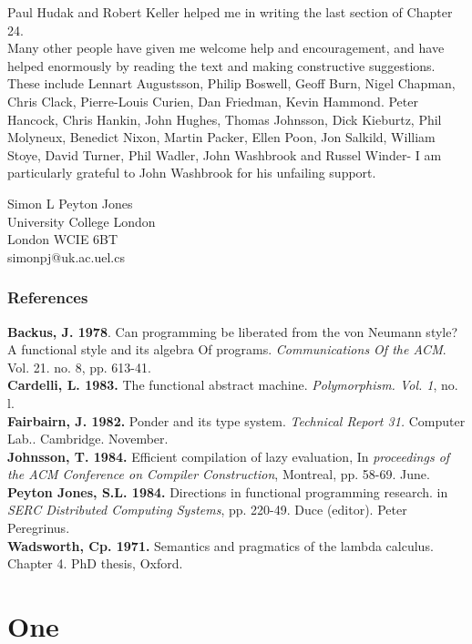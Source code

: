 \documentclass[11pt,a4paper]{book}
\begin{document}
Paul Hudak and Robert Keller helped me in writing the last section of 
Chapter 24.\\

Many other people have given me welcome help and encouragement, and 
have helped enormously by reading the text and making constructive 
suggestions. These include Lennart Augustsson, Philip Boswell, Geoff Burn, 
Nigel Chapman, Chris Clack, Pierre-Louis Curien, Dan Friedman, Kevin 
Hammond. Peter Hancock, Chris Hankin, John Hughes, Thomas Johnsson, 
Dick Kieburtz, Phil Molyneux, Benedict Nixon, Martin Packer, Ellen Poon, 
Jon Salkild, William Stoye, David Turner, Phil Wadler, John Washbrook and 
Russel Winder- I am particularly grateful to John Washbrook for his unfailing 
support.\\

\begin{flushright}
Simon L Peyton Jones\\
University College London\\ 
London WCIE 6BT\\
simonpj@uk.ac.uel.cs
\end{flushright}

\newpage
\section*{References}
\textbf{Backus, J. 1978}. Can programming be liberated from the von Neumann style? A 
functional style and its algebra Of programs. \textit{Communications Of the ACM}. Vol. 
21. no. 8, pp. 613-41.\\
\textbf{Cardelli, L. 1983.} The functional abstract machine. \textit{Polymorphism. Vol. 1}, no. l.\\ 
\textbf{Fairbairn, J. 1982.} Ponder and its type system. \textit{Technical Report 31.} Computer Lab.. 
Cambridge. November.\\ 
\textbf{Johnsson, T. 1984.} Efficient compilation of lazy evaluation, In \textit{proceedings of the ACM 
Conference on Compiler Construction}, Montreal, pp. 58-69. June.\\ 
\textbf{Peyton Jones, S.L. 1984.} Directions in functional programming research. in \textit{SERC 
Distributed Computing Systems}, pp. 220-49. Duce (editor). Peter Peregrinus.\\ 
\textbf{Wadsworth, Cp. 1971.} Semantics and pragmatics of the lambda calculus. Chapter 4. 
PhD thesis, Oxford. 

\part{One}
\end{document}
